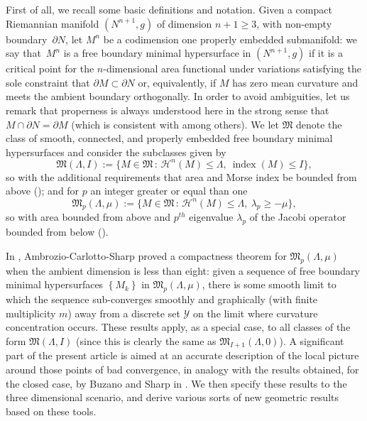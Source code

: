 \documentclass[10pt]{amsart}
\let\mathcal\mathscr
\newcounter{cas}
\newcommand{\sep}{\,:\,}
\DeclareMathOperator{\indx}{index}
\theoremstyle{definition}
\newcommand{\h}{\mathscr{H}}
\begin{document}
First of all, we recall some basic definitions and notation. Given a compact \hbox{Riemannian} manifold $(N^{n+1},g)$ of dimension $n+1\geq 3$, with non-empty boundary~$\partial N$, let $M^n$ be a codimension one properly embedded submanifold: we say that~$M^n$ is a free boundary minimal hypersurface in $(N^{n+1},g)$ if it is a critical point for the $n$-dimensional area functional under variations satisfying the sole constraint that $\partial M\subset\partial N$ or, equivalently, if $M$ has zero mean curvature and meets the ambient boundary orthogonally. In order to avoid ambiguities, let us remark that properness is always understood here in the strong sense that $M \cap \partial N=\partial M$ (which is consistent with \cite{FL14, LZ16B, ACS17, ACS18b} among others).
We let $\mathfrak{M}$ denote the class of smooth, connected, and properly embedded free boundary minimal hypersurfaces and consider the subclasses given by
\[
\mathfrak{M}(\Lambda,I) := \{ M \in \mathfrak{M} \sep \h^n(M) \leq \Lambda,\ \indx(M) \leq I\},
\]
so with the additional requirements that area and Morse index be bounded from above (\cf \cite{Sha15}); and for $p$ an integer greater or equal than one
\[
\mathfrak{M}_p(\Lambda,\mu) := \{ M \in \mathfrak{M} \sep \h^n(M) \leq \Lambda,\ \lambda_p \geq -\mu\},
\]
so with area bounded from above and $p^{th}$ eigenvalue $\lambda_p$ of the Jacobi operator bounded from below (\cf \cite{ACS15}).

In \cite{ACS17}, Ambrozio-Carlotto-Sharp proved a compactness theorem for $\mathfrak{M}_p(\Lambda,\mu)$ when the ambient dimension is less than eight: given a sequence of free boundary minimal hypersurfaces $\left\{M_k\right\}$ in $\mathfrak{M}_p(\Lambda,\mu)$, there is some smooth limit to which the sequence sub-converges smoothly and graphically (with finite multiplicity $m$) away from a discrete set $\mathcal{Y}$ on the limit where curvature concentration occurs. These results apply, as a special case, to all classes of the form $\mathfrak{M}(\Lambda,I)$ (since this is clearly the same as $\mathfrak{M}_{I+1}(\Lambda,0)$).
A significant part of the present article is aimed at an accurate description of the local picture around those points of bad convergence, in analogy with the results obtained, for the closed case, by Buzano and Sharp in \cite{BS17}. We then specify these results to the three dimensional scenario, and derive various sorts of new geometric results based on these tools.
\end{document}
